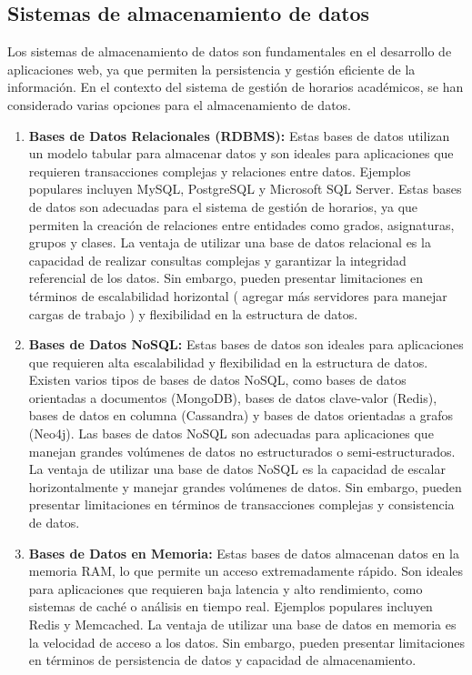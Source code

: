 \subsection{Sistemas de almacenamiento de datos}

Los sistemas de almacenamiento de datos son fundamentales en el desarrollo de aplicaciones web, ya que permiten la persistencia y gestión eficiente de la información. En el contexto del sistema de gestión de horarios académicos, se han considerado varias opciones para el almacenamiento de datos.
\begin{enumerate}
    \item \textbf{Bases de Datos Relacionales (RDBMS):} Estas bases de datos utilizan un modelo tabular para almacenar datos y son ideales para aplicaciones que requieren transacciones complejas y relaciones entre datos. Ejemplos populares incluyen MySQL, PostgreSQL y Microsoft SQL Server. Estas bases de datos son adecuadas para el sistema de gestión de horarios, ya que permiten la creación de relaciones entre entidades como grados, asignaturas, grupos y clases.\newline
        La ventaja de utilizar una base de datos relacional es la capacidad de realizar consultas complejas y garantizar la integridad referencial de los datos. Sin embargo, pueden presentar limitaciones en términos de escalabilidad horizontal ( agregar más servidores para manejar cargas de trabajo ) y flexibilidad en la estructura de datos.
    
    \item \textbf{Bases de Datos NoSQL:} Estas bases de datos son ideales para aplicaciones que requieren alta escalabilidad y flexibilidad en la estructura de datos. Existen varios tipos de bases de datos NoSQL, como bases de datos orientadas a documentos (MongoDB), bases de datos clave-valor (Redis), bases de datos en columna (Cassandra) y bases de datos orientadas a grafos (Neo4j). Las bases de datos NoSQL son adecuadas para aplicaciones que manejan grandes volúmenes de datos no estructurados o semi-estructurados.\newline
        La ventaja de utilizar una base de datos NoSQL es la capacidad de escalar horizontalmente y manejar grandes volúmenes de datos. Sin embargo, pueden presentar limitaciones en términos de transacciones complejas y consistencia de datos.

    \item \textbf{Bases de Datos en Memoria:} Estas bases de datos almacenan datos en la memoria RAM, lo que permite un acceso extremadamente rápido. Son ideales para aplicaciones que requieren baja latencia y alto rendimiento, como sistemas de caché o análisis en tiempo real. Ejemplos populares incluyen Redis y Memcached.\newline
        La ventaja de utilizar una base de datos en memoria es la velocidad de acceso a los datos. Sin embargo, pueden presentar limitaciones en términos de persistencia de datos y capacidad de almacenamiento.


\end{enumerate}
